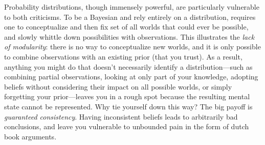 \documentclass{article}
\newcommand\changed[1]{{\color{note-fg} #1}}
\newcommand\changeoff{\color{black} }
\begin{document}
	\begin{example}
		
		
	\end{example}
	
	

	\changeoff
	
	\changed{Probability distributions, though immensely powerful, are particularly vulnerable to both criticisms. To be a Bayesian and rely entirely on a distribution, requires one to conceptualize and then fix set of all worlds that could ever be possible, and slowly whittle down possibilities with observations. This illustrates the} \textit{lack of modularity}: there is no way to conceptualize new worlds, and it is only possible to combine observations with an existing prior (that you trust). \changed{As a result, anything you might do that doesn't necessarily identify a distribution---such as combining partial observations, looking at only part of your knowledge, adopting beliefs without considering their impact on all possible worlds, or simply forgetting your prior---leaves you in a rough spot because the resulting mental state cannot be represented}.
	Why tie yourself down this way? The big payoff is \textit{guaranteed consistency}. Having inconsistent beliefs leads to arbitrarily bad conclusions, and leave you vulnerable to unbounded pain in the form of dutch book arguments. %
	
\end{document}
